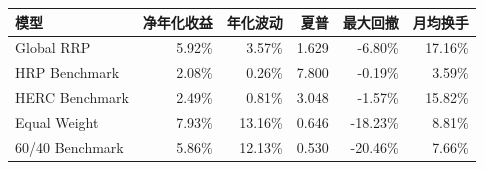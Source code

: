 \begin{tabular}{lrrrrr}
\toprule
模型 & 净年化收益 & 年化波动 & 夏普 & 最大回撤 & 月均换手\\\midrule
Global RRP & 5.92\% & 3.57\% & 1.629 & -6.80\% & 17.16\%\\
HRP Benchmark & 2.08\% & 0.26\% & 7.800 & -0.19\% & 3.59\%\\
HERC Benchmark & 2.49\% & 0.81\% & 3.048 & -1.57\% & 15.82\%\\
Equal Weight & 7.93\% & 13.16\% & 0.646 & -18.23\% & 8.81\%\\
60/40 Benchmark & 5.86\% & 12.13\% & 0.530 & -20.46\% & 7.66\%\\
\bottomrule
\end{tabular}